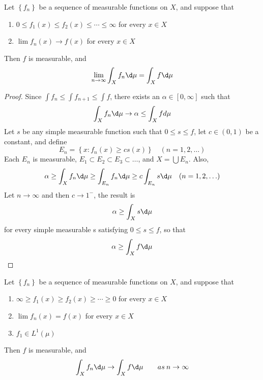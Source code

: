 \documentclass[12pt, a4paper, oneside]{book}
\begin{document}
\begin{theorem}
    Let $\left\{f_n\right\}$ be a sequence of measurable functions on $X$, and suppose that
    \begin{enumerate}[label=(\roman*)]
        \item $0\leq f_{1}( x) \leq f_{2}( x) \leq \cdots \leq \infty$ for every $x\in X$
        \item $\lim f_{n}(x)\to f(x)$ for every $x\in X$
    \end{enumerate}
    Then $f$ is measurable, and
    \begin{equation*}
        \lim_{n\to \infty}\int_X f_n\d \mu
        =
        \int_X f\d \mu
    \end{equation*}
    \begin{proof}
        Since $\int f_{n}\leq\int f_{n+1}\leq \int f$, there exists an $\alpha\in[0,\infty]$ such that
        \begin{equation*}
            \int_Xf_n\d \mu\to\alpha\leq \int_X fd\mu
        \end{equation*}
        Let $s$ be any simple measurable function such that $0\leq s\leq f$, let $c\in (0,1)$ be a constant, and define
        \begin{equation*}
            E_{n}=\left\{x:f_{n}(x)\geq cs(x)\right\} \quad(n=1,2,\ldots)
        \end{equation*}
        Each $E_n$ is measurable, $E_1\subset E_2\subset E_3\subset\ldots$, and $X=\bigcup E_n$. Also,
        $$\alpha\geq\int_{X}f_{n}\d \mu\geq\int_{E_{n}}f_{n}\d \mu\geq c\int_{E_{n}}s\d \mu\quad(n=1,2,\ldots)$$
        Let $n\to\infty$ and then $c\to 1^-$, the result is
        \begin{equation*}
            \alpha\geq\int_X s\d \mu
        \end{equation*}
        for every simple measurable s satisfying $0\leq s\leq f$, so that
        \begin{equation*}
            \alpha\geq\int_X f\d \mu
        \end{equation*}
    \end{proof}
\end{theorem}
\begin{corollary}
    Let $\left\{f_n\right\}$ be a sequence of measurable functions on $X$, and suppose that
    \begin{enumerate}
        \item
              $\infty \geq f_{1}( x) \geq f_{2}( x) \geq \cdots \geq 0$ for every $x\in X$
        \item
              $\lim f_{n}(x)= f(x)$ for every $x\in X$
        \item
              $f_1 \in L^1(\mu)$
    \end{enumerate}
    Then $f$ is measurable, and
    $$\int_X f_n\d \mu\to\int_X f\d \mu\quad\quad as\:n\to\infty$$
\end{corollary}
\end{document}
